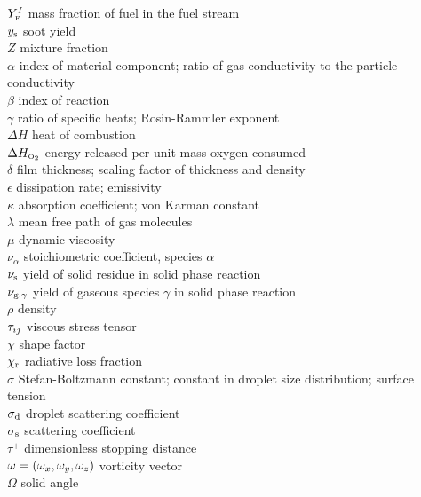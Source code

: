 \begin{tabbing}
$Y_{\tiny \hbox{F}}^I$                  \> mass fraction of fuel in the fuel stream   \\
$y_{\rm s}$               \> soot yield \\
$Z$                       \> mixture fraction   \\
$\alpha$                  \> index of material component; ratio of gas conductivity to the particle conductivity \\
$\beta$                   \> index of reaction \\
$\gamma$                  \> ratio of specific heats; Rosin-Rammler exponent \\
$\Delta H$                \> heat of combustion \\
$\Delta H_{\tiny \hbox{O}_2}$          \> energy released per unit mass oxygen consumed \\
$\delta$                  \> film thickness; scaling factor of thickness and density \\
$\epsilon$                \> dissipation rate; emissivity \\
$\kappa$                  \> absorption coefficient; von Karman constant \\
$\lambda$                 \> mean free path of gas molecules \\
$\mu$                     \> dynamic viscosity \\
$\nu_\alpha$              \> stoichiometric coefficient, species $\alpha$ \\
$\nu_{\rm s}$             \> yield of solid residue in solid phase reaction \\
$\nu_{{\rm g},\gamma}$    \> yield of gaseous species $\gamma$ in solid phase reaction \\
$\rho$                    \> density \\
${\bf \tau}_{ij}$              \> viscous stress tensor \\
$\chi$                    \> shape factor \\
$\chi_{\rm r}$            \> radiative loss fraction \\
$\sigma$                  \> Stefan-Boltzmann constant; constant in droplet size distribution; surface tension \\
$\sigma_{\rm d}$          \> droplet scattering coefficient \\
$\sigma_{\rm s}$          \> scattering coefficient \\
$\tau^+$                  \> dimensionless stopping distance \\
${\bf \omega}=(\omega_x,\omega_y,\omega_z)$    \> vorticity vector \\
$\Omega$                  \> solid angle \\
\end{tabbing}






